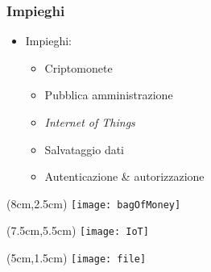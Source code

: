 \begin{frame}
  \frametitle{Impieghi}

  \begin{itemize}
   \item<1-> Impieghi:
   \begin{itemize}
    \item<2-> Criptomonete
    \item<3-> Pubblica amministrazione
    \item<4-> \textit{Internet of Things}
    \item<5-> Salvataggio dati
    \item<6-> Autenticazione \& autorizzazione
   \end{itemize}
  \end{itemize}

 \begin{textblock*}{5cm}(8cm,2.5cm)
  \texttt{[image: bagOfMoney]}
 \end{textblock*}

 \begin{textblock*}{5cm}(7.5cm,5.5cm)
  \texttt{[image: IoT]}
 \end{textblock*}
 
 \begin{textblock*}{5cm}(5cm,1.5cm)
  \texttt{[image: file]}
 \end{textblock*}


\end{frame}
